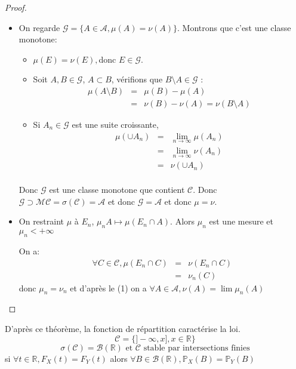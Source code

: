 \begin{proof}
	\begin{itemize}
		\item On regarde $\mathscr{G} = \{A \in \mathscr{A}, \mu(A) = \nu(A)\}$. Montrons que c'est une classe monotone:
		      \begin{itemize}
			      \item $\mu (E) = \nu (E), $donc $E\in \mathscr{G}$.
			      \item Soit $A,B \in \mathscr{G}$, $A\subset B $, vérifions que $B\setminus A \in \mathscr{G}$ :
			            \begin{eqnarray*}
				            \mu(A \setminus B ) &=& \mu(B)- \mu(A) \\
				            &=& \nu (B) - \nu(A) = \nu (B\setminus A)
			            \end{eqnarray*}
			      \item Si $A_n \in \mathscr{G}$ est une suite croissante,
			            \begin{eqnarray*}
				            \mu(\cup A_n) &=& \lim\limits_{n \to \infty} \mu(A_n) \\
				            &=& \lim\limits_{n \to \infty} \nu(A_n) \\
				            &=& \nu(\cup A_n) \\
			            \end{eqnarray*}
		      \end{itemize}
		      Donc $\mathscr{G}$ est une classe monotone que contient $\mathscr{C}$.
		      Donc $\mathscr{G} \supset\mathscr{M}\mathscr{C} = \sigma(\mathscr{C}) = \mathscr{A}$ et
		      donc $\mathscr{G} = \mathscr{A}$ et donc $\mu = \nu$.
		\item
		      On restraint $\mu$ à $E_n$, $\mu_n A \mapsto \mu(E_n \cap A)$.
		      Alors $\mu_n$ est une mesure et $\mu_n < +\infty$

		      On a:
		      \begin{eqnarray*}
			      \forall C \in \mathscr{C}, \mu (E_n \cap C) &=& \nu (E_n \cap C) \\
			      &=& \nu_n(C)
		      \end{eqnarray*}
		      donc $\mu_n = \nu_n$ et d'après le (1) on a $\forall A \in \mathscr{A}, \nu(A) = \lim \mu_n(A)$
	\end{itemize}
\end{proof}


\begin{remarque}
	D'après ce théorème, la fonction de répartition caractérise la loi.
	$$ \mathscr{C} = \{ ]-\infty, x], x \in \mathbb{R} \} $$
	$$ \sigma(\mathscr{C}) = \mathscr{B}(\mathbb{R}) \text{ et } \mathscr{C} \text{ stable par intersections finies}$$
	si $\forall t \in \mathbb{R}, F_X(t) = F_Y(t)$ alors $\forall B \in \mathscr{B}(\mathbb{R}), \mathbb{P}_X(B) = \mathbb{P}_Y(B)$
\end{remarque}


